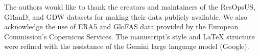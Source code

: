 \documentclass[hess, manuscript]{copernicus}
\begin{document}


\begin{acknowledgements}
The authors would like to thank the creators and maintainers of the ResOpsUS, GRanD, and GDW datasets for making their data publicly available. We also acknowledge the use of ERA5 and GloFAS data provided by the European Commission's Copernicus Services.
The manuscript's style and LaTeX structure were refined with the assistance of the Gemini large language model (Google).
\end{acknowledgements}
















\end{document}
